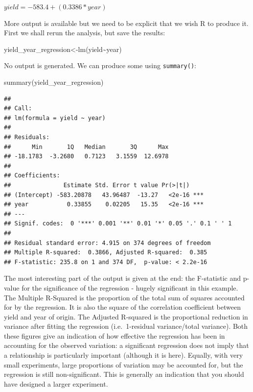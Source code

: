 \documentclass[
]{book}
\newenvironment{Shaded}{\begin{snugshade}}{\end{snugshade}}
\newcommand{\FunctionTok}[1]{\textcolor[rgb]{0.00,0.00,0.00}{#1}}
\newcommand{\NormalTok}[1]{#1}
\newcommand{\OtherTok}[1]{\textcolor[rgb]{0.56,0.35,0.01}{#1}}
\newcommand{\SpecialCharTok}[1]{\textcolor[rgb]{0.00,0.00,0.00}{#1}}
\begin{document}
\(yield = -583.4 + (0.3386 * year)\)

More output is available but we need to be explicit that we wish R to produce it. First we shall rerun the analysis, but save the results:

\begin{Shaded}
\begin{Highlighting}[]
\NormalTok{yield\_year\_regression}\OtherTok{\textless{}{-}}\FunctionTok{lm}\NormalTok{(yield}\SpecialCharTok{\textasciitilde{}}\NormalTok{year)}
\end{Highlighting}
\end{Shaded}

No output is generated. We can produce some using \texttt{summary()}:

\begin{Shaded}
\begin{Highlighting}[]
\FunctionTok{summary}\NormalTok{(yield\_year\_regression)}
\end{Highlighting}
\end{Shaded}

\begin{verbatim}
## 
## Call:
## lm(formula = yield ~ year)
## 
## Residuals:
##      Min       1Q   Median       3Q      Max 
## -18.1783  -3.2680   0.7123   3.1559  12.6978 
## 
## Coefficients:
##               Estimate Std. Error t value Pr(>|t|)    
## (Intercept) -583.20878   43.96487  -13.27   <2e-16 ***
## year           0.33855    0.02205   15.35   <2e-16 ***
## ---
## Signif. codes:  0 '***' 0.001 '**' 0.01 '*' 0.05 '.' 0.1 ' ' 1
## 
## Residual standard error: 4.915 on 374 degrees of freedom
## Multiple R-squared:  0.3866, Adjusted R-squared:  0.385 
## F-statistic: 235.8 on 1 and 374 DF,  p-value: < 2.2e-16
\end{verbatim}

The most interesting part of the output is given at the end: the F-statistic and p-value for the significance of the regression - hugely significant in this example. The Multiple R-Squared is the proportion of the total sum of squares accounted for by the regression. It is also the square of the correlation coefficient between yield and year of origin. The Adjusted R-squared is the proportional reduction in variance after fitting the regression (i.e.~1-residual variance/total variance). Both these figures give an indication of how effective the regression has been in accounting for the observed variation: a significant regression does not imply that a relationship is particularly important (although it is here). Equally, with very small experiments, large proportions of variation may be accounted for, but the regression is still non-significant. This is generally an indication that you should have designed a larger experiment.
\end{document}
